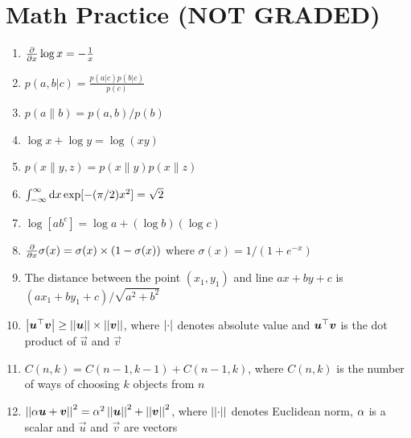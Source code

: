 \documentclass[fleqn]{article}
\begin{document}

\section{ Math Practice (NOT GRADED)}
\begin{enumerate}
	\setlength{\itemsep}{1.2\baselineskip}
	\item $\frac \partial {\partial x} \log x = - \frac 1 x$
	\item $p(a, b | c) = \frac{p(a | c)p(b | c)}{p(c)}$
	\item $p(a \| b) = p(a,b) / p(b)$
	\item $\log x + \log y = \log (xy)$
	\item $p(x \| y,z) = p(x \| y) p(x \| z)$
	\item $\int_{-\infty}^{\infty} \textrm{d} x \exp[-(\pi/2) x^2] = \sqrt{2}$
	\item $\log [ab^c] = \log a + (\log b) (\log c)$
	\item $\frac \partial {\partial x} \sigma(x) = \sigma(x)\times(1-\sigma(x))$ where $\sigma(x) = 1/(1+e^{-x})$
	\item The distance between the point $(x_1,y_1)$ and line $ax + by + c$ is ${(ax_1 + by_1+c)}/{\sqrt{a^2 + b^2}}$

	\item $\left\vert \boldsymbol{u}{}^\top\boldsymbol{v} \right\vert \geq \left\vert\left\vert \boldsymbol{u} \right\vert\right\vert \times \left\vert\left\vert \boldsymbol{v} \right\vert\right\vert$, where $\left\vert \cdot \right\vert$ denotes absolute value and $\boldsymbol{u}{}^\top\boldsymbol{v}$ is the dot product of $\vec u$ and $\vec v$
	\item $C(n,k) = C(n-1, k-1) + C(n-1, k)$, where $C(n,k)$ is the number of ways of choosing $k$ objects from $n$
	\item $\left\vert\left\vert \alpha \boldsymbol{u} + \boldsymbol{v} \right\vert\right\vert^2 = \alpha^2 \left\vert\left\vert \boldsymbol{u} \right\vert\right\vert^2 + \left\vert\left\vert \boldsymbol{v} \right\vert\right\vert^2$, where $\left\vert\left\vert \cdot \right\vert\right\vert$ denotes Euclidean norm, $\alpha$ is a scalar and $\vec u$ and $\vec v$ are vectors

\end{enumerate}
\end{document}
